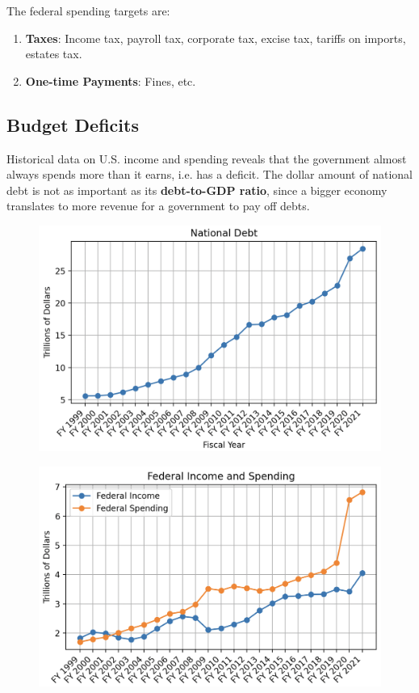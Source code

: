 \documentclass{article}
\begin{document}
    \begin{definition}
      The federal spending targets are: 
      \begin{enumerate}
        \item \textbf{Taxes}: Income tax, payroll tax, corporate tax, excise tax, tariffs on imports, estates tax.
        \item \textbf{One-time Payments}: Fines, etc.
      \end{enumerate}
    \end{definition}

  \subsection{Budget Deficits}

    Historical data on U.S. income and spending reveals that the government almost always spends more than it earns, i.e. has a deficit. The dollar amount of national debt is not as important as its \textbf{debt-to-GDP ratio}, since a bigger economy translates to more revenue for a government to pay off debts.

    \begin{figure}[H]
      \centering 
      \includegraphics[scale=0.6]{img/national_debt.png}
      \caption{} 
      \label{fig:national_debt}
    \end{figure}

    \begin{figure}[H]
      \centering 
      \includegraphics[scale=0.6]{img/income_spending.png}
      \caption{} 
      \label{fig:income_spending}
    \end{figure}
\end{document}
